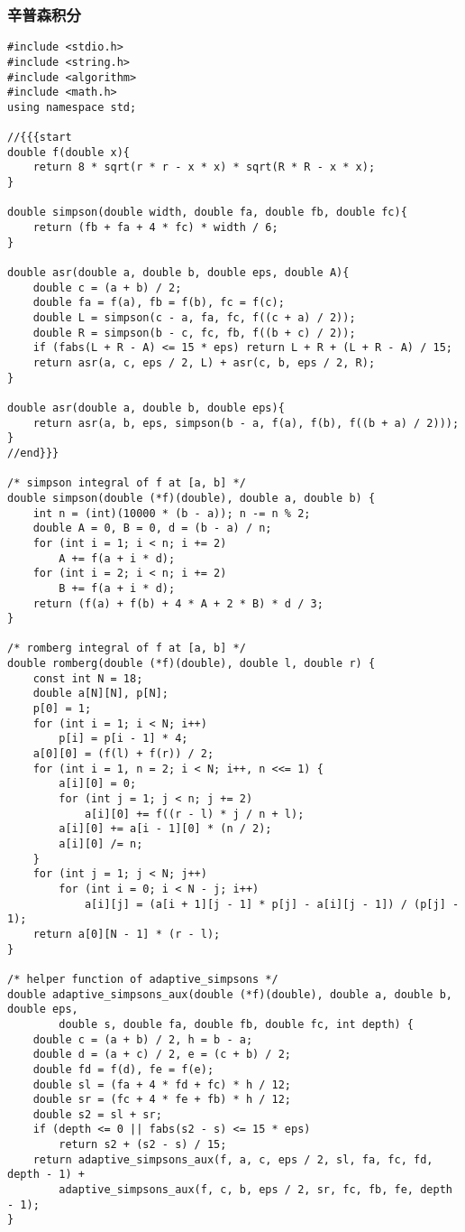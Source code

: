 \subsubsection{辛普森积分}
\begin{verbatim}
#include <stdio.h>
#include <string.h>
#include <algorithm>
#include <math.h>
using namespace std;

//{{{start
double f(double x){
	return 8 * sqrt(r * r - x * x) * sqrt(R * R - x * x);
}

double simpson(double width, double fa, double fb, double fc){
	return (fb + fa + 4 * fc) * width / 6;
}

double asr(double a, double b, double eps, double A){
	double c = (a + b) / 2;
	double fa = f(a), fb = f(b), fc = f(c);
	double L = simpson(c - a, fa, fc, f((c + a) / 2));
	double R = simpson(b - c, fc, fb, f((b + c) / 2));
	if (fabs(L + R - A) <= 15 * eps) return L + R + (L + R - A) / 15;
	return asr(a, c, eps / 2, L) + asr(c, b, eps / 2, R);
}

double asr(double a, double b, double eps){
	return asr(a, b, eps, simpson(b - a, f(a), f(b), f((b + a) / 2)));
}
//end}}}

/* simpson integral of f at [a, b] */
double simpson(double (*f)(double), double a, double b) {
    int n = (int)(10000 * (b - a)); n -= n % 2;
    double A = 0, B = 0, d = (b - a) / n;
    for (int i = 1; i < n; i += 2)
        A += f(a + i * d);
    for (int i = 2; i < n; i += 2)
        B += f(a + i * d);
    return (f(a) + f(b) + 4 * A + 2 * B) * d / 3;
}

/* romberg integral of f at [a, b] */
double romberg(double (*f)(double), double l, double r) {
    const int N = 18;
    double a[N][N], p[N];
    p[0] = 1;
    for (int i = 1; i < N; i++)
        p[i] = p[i - 1] * 4;
    a[0][0] = (f(l) + f(r)) / 2;
    for (int i = 1, n = 2; i < N; i++, n <<= 1) {
        a[i][0] = 0;
        for (int j = 1; j < n; j += 2)
            a[i][0] += f((r - l) * j / n + l);
        a[i][0] += a[i - 1][0] * (n / 2);
        a[i][0] /= n;
    }
    for (int j = 1; j < N; j++)
        for (int i = 0; i < N - j; i++)
            a[i][j] = (a[i + 1][j - 1] * p[j] - a[i][j - 1]) / (p[j] - 1);
    return a[0][N - 1] * (r - l);
}

/* helper function of adaptive_simpsons */
double adaptive_simpsons_aux(double (*f)(double), double a, double b, double eps,
        double s, double fa, double fb, double fc, int depth) {
    double c = (a + b) / 2, h = b - a;
    double d = (a + c) / 2, e = (c + b) / 2;
    double fd = f(d), fe = f(e);
    double sl = (fa + 4 * fd + fc) * h / 12;
    double sr = (fc + 4 * fe + fb) * h / 12;
    double s2 = sl + sr;
    if (depth <= 0 || fabs(s2 - s) <= 15 * eps)
        return s2 + (s2 - s) / 15;
    return adaptive_simpsons_aux(f, a, c, eps / 2, sl, fa, fc, fd, depth - 1) +
        adaptive_simpsons_aux(f, c, b, eps / 2, sr, fc, fb, fe, depth - 1);
}


\end{verbatim}
